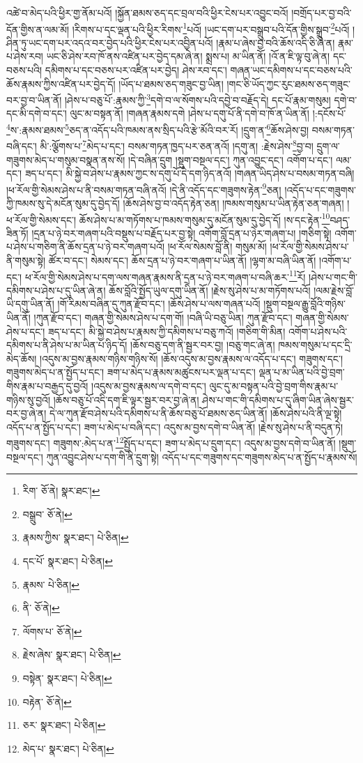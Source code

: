 འཚེ་བ་མེད་པའི་ཕྱིར་གྱ་ནོམ་པའོ། །སྐྱོན་ཐམས་ཅད་དང་བྲལ་བའི་ཕྱིར་ངེས་པར་འབྱུང་བའོ། །བགྲོད་པར་བྱ་བའི་དོན་གྱིས་ན་ལམ་མོ། །རིགས་པ་དང་ལྡན་པའི་ཕྱིར་རིགས་\footnote{རིག་  ཅོ་ནེ།  སྣར་ཐང་། }པའོ། །ཡང་དག་པར་བསྒྲུབ་པའི་དོན་གྱིས་སྒྲུབ་\footnote{བསྒྲུབ་  ཅོ་ནེ། }པའོ། །ཤིན་ཏུ་ཡང་དག་པར་འདའ་བར་བྱེད་པའི་ཕྱིར་ངེས་པར་འབྱིན་པའོ། །རྣམ་པ་ཞེས་བྱ་བའི་ཆོས་འདི་ཅི་ཞེ་ན། རྣམ་པ་ཤེས་རབ། ཡང་ཅི་ཤེས་རབ་ཁོ་ནས་འཛིན་པར་བྱེད་དམ་ཞེ་ན། སྨྲས་པ། མ་ཡིན་ནོ། །འོ་ན་ཇི་ལྟ་བུ་ཞེ་ན། དང་བཅས་པའི། དམིགས་པ་དང་བཅས་པར་འཛིན་པར་བྱེད། ཤེས་རབ་དང་། གཞན་ཡང་དམིགས་པ་དང་བཅས་པའི་ཆོས་རྣམས་ཀྱིས་འཛིན་པར་བྱེད་དོ། །ཡོད་པ་ཐམས་ཅད་གཟུང་བྱ་ཡིན། །གང་ཅི་ཡོད་ཀྱང་རུང་ཐམས་ཅད་གཟུང་བར་བྱ་བ་ཡིན་ནོ། །ཤེས་པ་བཅུ་པོ་:རྣམས་ཀྱི་\footnote{རྣམས་ཀྱིས་  སྣར་ཐང་།  པེ་ཅིན། }དགེ་བ་ལ་སོགས་པའི་དབྱེ་བ་བརྗོད་དེ། དང་པོ་རྣམ་གསུམ། དགེ་བ་དང་མི་དགེ་བ་དང་། ལུང་མ་བསྟན་ནོ། །གཞན་རྣམས་དགེ །ཤེས་པ་དགུ་པོ་ནི་དགེ་བ་ཁོ་ན་ཡིན་ནོ། །:དངོས་པོ་\footnote{དང་པོ་  སྣར་ཐང་།  པེ་ཅིན། }ས་:རྣམས་ཐམས་\footnote{རྣམས་  པེ་ཅིན། }ཅད་ན་འདོད་པའི་ཁམས་ནས་སྲིད་པའི་རྩེ་མོའི་བར་རོ། །དྲུག་ན་\footnote{ནི་  ཅོ་ནེ། }ཆོས་ཤེས་བྱ། བསམ་གཏན་བཞི་དང་། མི་:ལྕོགས་པ་\footnote{ལོགས་པ་  ཅོ་ནེ། }མེད་པ་དང་། བསམ་གཏན་ཁྱད་པར་ཅན་ནའོ། །དགུ་ན། :རྗེས་ཤེས་\footnote{རྗེས་ཞེས་  སྣར་ཐང་།  པེ་ཅིན། }བྱ་བ། དྲུག་ལ་གཟུགས་མེད་པ་གསུམ་བསྣན་ནས་སོ། །དེ་བཞིན་དྲུག །སྡུག་བསྔལ་དང་། ཀུན་འབྱུང་དང་། འགོག་པ་དང་། ལམ་དང་། ཟད་པ་དང་། མི་སྐྱེ་བ་ཤེས་པ་རྣམས་ཀྱང་ས་དགུ་པོ་དེ་དག་ཉིད་ནའོ། །གཞན་ཡིད་ཤེས་པ་བསམ་གཏན་བཞི། །ཕ་རོལ་གྱི་སེམས་ཤེས་པ་ནི་བསམ་གཏན་བཞི་ནའོ། །དེ་ནི་འདོད་དང་གཟུགས་རྟེན་\footnote{བསྟེན་  སྣར་ཐང་།  པེ་ཅིན། }ཅན། །འདོད་པ་དང་གཟུགས་ཀྱི་ཁམས་སུ་དེ་མངོན་སུམ་དུ་བྱེད་དོ། །ཆོས་ཤེས་བྱ་བ་འདོད་རྟེན་ཅན། །ཁམས་གསུམ་པ་ཡིན་རྟེན་ཅན་གཞན། །ཕ་རོལ་གྱི་སེམས་དང་། ཆོས་ཤེས་པ་མ་གཏོགས་པ་ཁམས་གསུམ་དུ་མངོན་སུམ་དུ་བྱེད་དོ། །ས་དང་རྟེན་\footnote{བརྟེན་  ཅོ་ནེ། }བཤད་ཟིན་ཏོ། །དྲན་པ་ཉེ་བར་གཞག་པའི་བསྡུས་པ་བརྗོད་པར་བྱ་སྟེ། འགོག་བློ་དྲན་པ་ཉེར་གཞག་པ། །གཅིག་སྟེ། འགོག་པ་ཤེས་པ་གཅིག་ནི་ཆོས་དྲན་པ་ཉེ་བར་གཞག་པའོ། །ཕ་རོལ་སེམས་བློ་ནི། གསུམ་མོ། །ཕ་རོལ་གྱི་སེམས་ཤེས་པ་ནི་གསུམ་སྟེ། ཚོར་བ་དང་། སེམས་དང་། ཆོས་དྲན་པ་ཉེ་བར་གཞག་པ་ཡིན་ནོ། །ལྷག་མ་བཞི་ཡིན་ནོ། །འགོག་པ་དང་། ཕ་རོལ་གྱི་སེམས་ཤེས་པ་དག་ལས་གཞན་རྣམས་ནི་དྲན་པ་ཉེ་བར་གཞག་པ་བཞི་ཆར་\footnote{ཅར་  སྣར་ཐང་།  པེ་ཅིན། }རོ། །ཤེས་པ་གང་གི་དམིགས་པ་ཤེས་པ་དུ་ཡིན་ཞེ་ན། ཆོས་བློའི་སྤྱོད་ཡུལ་དགུ་ཡིན་ནོ། །རྗེས་སུ་ཤེས་པ་མ་གཏོགས་པའོ། །ལམ་རྗེས་བློ་ཡི་དགུ་ཡིན་ནོ། །གོ་རིམས་བཞིན་དུ་ཀུན་རྫོབ་དང་། །ཆོས་ཤེས་པ་ལས་གཞན་པའོ། །སྡུག་བསྔལ་རྒྱུ་བློའི་གཉིས་ཡིན་ནོ། །ཀུན་རྫོབ་དང་། གཞན་གྱི་སེམས་ཤེས་པ་དག་གོ། །བཞི་ཡི་བཅུ་ཡིན། ཀུན་རྫོབ་དང་། གཞན་གྱི་སེམས་ཤེས་པ་དང་། ཟད་པ་དང་། མི་སྐྱེ་བ་ཤེས་པ་རྣམས་ཀྱི་དམིགས་པ་བཅུ་ཀའོ། །གཅིག་གི་མིན། འགོག་པ་ཤེས་པའི་དམིགས་པ་ནི་ཤེས་པ་མ་ཡིན་པ་ཉིད་དོ། །ཆོས་བཅུ་དག་ནི་སྦྱར་བར་བྱ། །བཅུ་གང་ཞེ་ན། ཁམས་གསུམ་པ་དང་དྲི་མེད་ཆོས། །འདུས་མ་བྱས་རྣམས་གཉིས་གཉིས་སོ། །ཆོས་འདུས་མ་བྱས་རྣམས་ལ་འདོད་པ་དང་། གཟུགས་དང་། གཟུགས་མེད་པ་ན་སྤྱོད་པ་དང་། ཟག་པ་མེད་པ་རྣམས་མཚུངས་པར་ལྡན་པ་དང་། ལྡན་པ་མ་ཡིན་པའི་བྱེ་བྲག་གིས་རྣམ་པ་བརྒྱད་དུ་བྱའོ། །འདུས་མ་བྱས་རྣམས་ལ་དགེ་བ་དང་། ལུང་དུ་མ་བསྟན་པའི་བྱེ་བྲག་གིས་རྣམ་པ་གཉིས་སུ་བྱའོ། །ཆོས་བཅུ་པོ་འདི་དག་ཇི་ལྟར་སྦྱར་བར་བྱ་ཞེ་ན། ཤེས་པ་གང་གི་དམིགས་པ་དུ་ཞིག་ཡིན་ཞེས་སྦྱར་བར་བྱ་ཞེ་ན། དེ་ལ་ཀུན་རྫོབ་ཤེས་པའི་དམིགས་པ་ནི་ཆོས་བཅུ་པོ་ཐམས་ཅད་ཡིན་ནོ། །ཆོས་ཤེས་པའི་ནི་ལྔ་སྟེ། འདོད་པ་ན་སྤྱོད་པ་དང་། ཟག་པ་མེད་པ་བཞི་དང་། འདུས་མ་བྱས་དགེ་བ་ཡིན་ནོ། །རྗེས་སུ་ཤེས་པ་ནི་བདུན་ཏེ། གཟུགས་དང་། གཟུགས་:མེད་པ་ན་\footnote{མེད་པ་  སྣར་ཐང་།  པེ་ཅིན། }སྤྱོད་པ་དང་། ཟག་པ་མེད་པ་དྲུག་དང་། འདུས་མ་བྱས་དགེ་བ་ཡིན་ནོ། །སྡུག་བསྔལ་དང་། ཀུན་འབྱུང་ཤེས་པ་དག་གི་ནི་དྲུག་སྟེ། འདོད་པ་དང་གཟུགས་དང་གཟུགས་མེད་པ་ན་སྤྱོད་པ་རྣམས་སོ། 